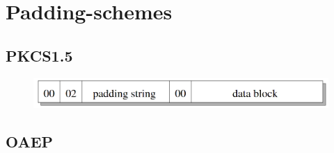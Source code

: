 \documentclass[../master.tex]{subfiles}
\begin{document}
    \section{Padding-schemes}
    \subsection{PKCS1.5}
    \begin{figure}[h]
        \centering
        \includegraphics[width=.7\linewidth]{img/PKCS-15}
        \label{fig:figure}
    \end{figure}


    \subsection{OAEP}
\end{document}

